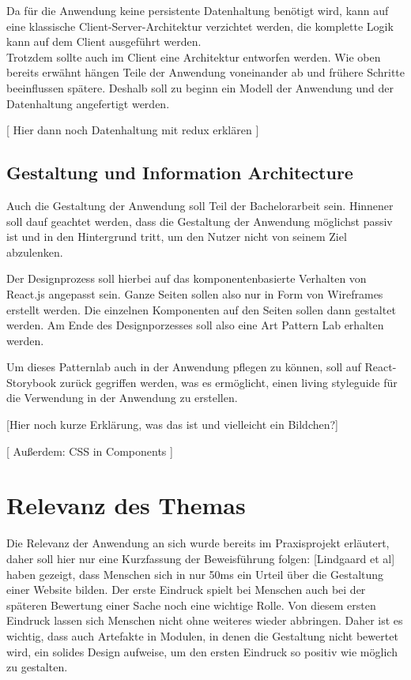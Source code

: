 Da für die Anwendung keine persistente Datenhaltung benötigt wird, kann auf eine klassische Client-Server-Architektur verzichtet werden, die komplette Logik kann auf dem Client ausgeführt werden.\\
Trotzdem sollte auch im Client eine Architektur entworfen werden. Wie oben bereits erwähnt hängen Teile der Anwendung voneinander ab und frühere Schritte beeinflussen spätere. Deshalb soll zu beginn ein Modell der Anwendung und der Datenhaltung angefertigt werden.

[ Hier dann noch Datenhaltung mit redux erklären ]

\subsection{Gestaltung und Information Architecture}
Auch die Gestaltung der Anwendung soll Teil der Bachelorarbeit sein. Hinnener soll dauf geachtet werden, dass die Gestaltung der Anwendung möglichst passiv ist und in den Hintergrund tritt, um den Nutzer nicht von seinem Ziel abzulenken.

Der Designprozess soll hierbei auf das komponentenbasierte Verhalten von React.js angepasst sein. Ganze Seiten sollen also nur in Form von Wireframes erstellt werden. Die einzelnen Komponenten auf den Seiten sollen dann gestaltet werden. Am Ende des Designporzesses soll also eine Art Pattern Lab erhalten werden.

Um dieses Patternlab auch in der Anwendung pflegen zu können, soll auf React-Storybook zurück gegriffen werden, was es ermöglicht, einen living styleguide für die Verwendung in der Anwendung zu erstellen.

[Hier noch kurze Erklärung, was das ist und vielleicht ein Bildchen?]

[ Außerdem: CSS in Components ]

\section{Relevanz des Themas}
Die Relevanz der Anwendung an sich wurde bereits im Praxisprojekt erläutert, daher soll hier nur eine Kurzfassung der Beweisführung folgen:
[Lindgaard et al] haben gezeigt, dass Menschen sich in nur 50ms ein Urteil über die Gestaltung einer Website bilden. Der erste Eindruck spielt bei Menschen auch bei der späteren Bewertung einer Sache noch eine wichtige Rolle.  Von diesem ersten Eindruck lassen sich Menschen nicht ohne weiteres wieder abbringen.
Daher ist es wichtig, dass auch Artefakte in Modulen, in denen die Gestaltung nicht bewertet wird, ein solides Design aufweise, um den ersten Eindruck so positiv wie möglich zu gestalten.

